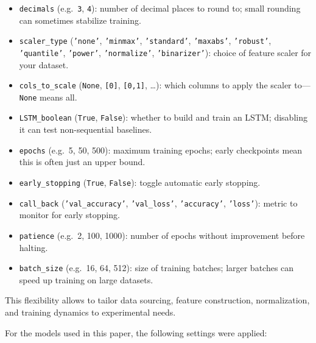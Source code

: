 \documentclass[letterpaper]{article}
\begin{document}
\begin{itemize}[left=0pt]
       \item \texttt{decimals} (e.g.\ \texttt{3}, \texttt{4}): number of decimal places to round to; small rounding can sometimes stabilize training.
       \item \texttt{scaler\_type} (\texttt{'none'}, \texttt{'minmax'}, \texttt{'standard'}, \texttt{'maxabs'}, \texttt{'robust'}, \texttt{'quantile'}, \texttt{'power'}, \texttt{'normalize'}, \texttt{'binarizer'}): choice of feature scaler for your dataset.
       \item \texttt{cols\_to\_scale} (\texttt{None}, \texttt{[0]}, \texttt{[0,1]}, …): which columns to apply the scaler to—\texttt{None} means all.
       \item \texttt{LSTM\_boolean} (\texttt{True}, \texttt{False}): whether to build and train an LSTM; disabling it can test non-sequential baselines.
       \item \texttt{epochs} (e.g.\ 5, 50, 500): maximum training epochs; early checkpoints mean this is often just an upper bound.
       \item \texttt{early\_stopping} (\texttt{True}, \texttt{False}): toggle automatic early stopping.
       \item \texttt{call\_back} (\texttt{'val\_accuracy'}, \texttt{'val\_loss'}, \texttt{'accuracy'}, \texttt{'loss'}): metric to monitor for early stopping.
       \item \texttt{patience} (e.g.\ 2, 100, 1000): number of epochs without improvement before halting.
       \item \texttt{batch\_size} (e.g.\ 16, 64, 512): size of training batches; larger batches can speed up training on large datasets.
   
\end{itemize}

This flexibility allows to tailor data sourcing, feature construction, normalization, and training dynamics to experimental needs.

For the models used in this paper, the following settings were applied:
\end{document}
